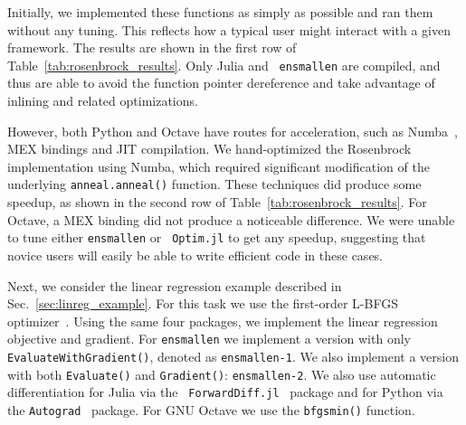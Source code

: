 \documentclass{article}
\begin{document}
% 


Initially, we implemented these functions as simply as possible and ran them
without any tuning. This reflects how a typical user might interact with a
given framework.
The results are shown in the first row of
Table~\ref{tab:rosenbrock_results}.  Only Julia and {\tt
ensmallen} are compiled, and thus are able to avoid the function pointer
dereference and take advantage of inlining and related optimizations.

However, both Python and Octave have routes for acceleration,
such as Numba~\cite{lam2015numba}, MEX bindings and JIT compilation.
We hand-optimized the Rosenbrock implementation using Numba,
which required significant modification of the
underlying \texttt{\small anneal.anneal()} function.
These techniques did produce some speedup,
as shown in the second row of Table~\ref{tab:rosenbrock_results}.
For Octave, a MEX binding did not produce a noticeable difference.
We were unable to tune either \texttt{\small ensmallen} or \texttt{\small
Optim.jl} to get any speedup, suggesting that novice users will easily be able
to write efficient code in these cases.

Next, we consider the linear regression example described in
Sec.~\ref{sec:linreg_example}.  For this task we use the first-order L-BFGS
optimizer~\cite{zhu1997algorithm}.  Using the same four packages, we implement
the linear regression objective and gradient.  For \texttt{\small ensmallen} we
implement a version with only \texttt{\small EvaluateWithGradient()},
denoted as \texttt{\small ensmallen-1}.  We also implement a version with both
\texttt{\small Evaluate()} and \texttt{\small Gradient()}: \texttt{\small ensmallen-2}.
We also use automatic differentiation for Julia via the \texttt{\small
ForwardDiff.jl}~\cite{RevelsLubinPapamarkou2016} package and for Python via the
\texttt{\small Autograd}~\cite{maclaurin2015autograd}
package.  For GNU Octave we use the \texttt{\small bfgsmin()} function.
\end{document}
